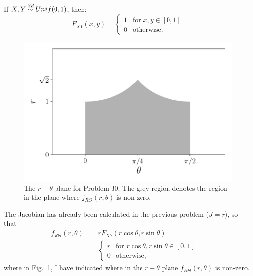 \begin{problem}{30} If $X, Y\distas{iid} Unif(0, 1)$, then:
\[
 F_{XY}(x,y) =
  \begin{cases}
                                  1 & \text{for $x, y \in [0, 1]$} \\
                                   0 & \text {otherwise}.
   \end{cases}
\]
	\begin{figure}[t]
	\centering
      		 \includegraphics[totalheight=6cm]{chpt5/prob30b.pdf}
  			  \caption{The $r-\theta$ plane for Problem 30.  The grey region denotes the region in the plane where $f_{R\Theta}(r, \theta)$ is non-zero.}
    			   \label{fig:prob_30b}
	\end{figure}
The Jacobian has already been calculated in the previous problem ($J=r$), so that
\begin{align*}  
f_{R\Theta}(r, \theta) &= rF_{XY}(r\cos \theta ,r \sin \theta) \\
& = \begin{cases}
                                  r & \text{for $r\cos \theta ,r \sin \theta \in [0, 1]$} \\
                                   0 & \text {otherwise},
    \end{cases} \quad
\end{align*}
where in Fig.~\ref{fig:prob_30b}, I have indicated where in the $r-\theta$ plane $f_{R\Theta}(r, \theta)$ is non-zero.




\end{problem}
